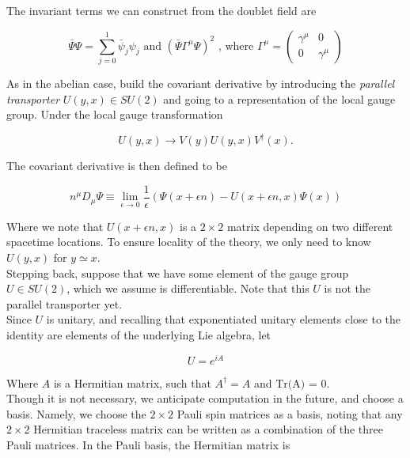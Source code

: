 \documentclass[10pt]{article}
\begin{document}
\noindent The invariant terms we can construct from the doublet field are 

\begin{equation}
\bar{\Psi} \Psi = \sum_{j=0}^1 \bar{\psi}_j \psi_j \text{ and } (\bar{\Psi} \Gamma^\mu \Psi)^2 \text{ , where } \Gamma^\mu = 
\left( \begin{array}{cc}
\gamma^\mu & 0 \\
0 & \gamma^\mu
\end{array} \right)
\end{equation}

\noindent As in the abelian case, build the covariant derivative by introducing the \textit{parallel transporter} $U(y,x) \in SU(2)$ and going to a representation of the local gauge group. Under the local gauge transformation

\begin{equation}
U(y,x) \rightarrow V(y) U(y,x) V^\dagger (x).
\end{equation}

\noindent The covariant derivative is then defined to be

\begin{equation}
n^\mu D_\mu \Psi \equiv \lim_{\epsilon \rightarrow 0} \frac{1}{\epsilon} (\Psi (x + \epsilon n) - U(x + \epsilon n, x) \Psi (x))
\end{equation}

\noindent Where we note that $U(x + \epsilon n, x)$ is a $2 \times 2$ matrix depending on two different spacetime locations. To ensure locality of the theory, we only need to know $U(y,x)$ for $y \simeq x$.\\

\noindent Stepping back, suppose that we have some element of the gauge group $U \in SU(2)$, which we assume is differentiable. Note that this $U$ is not the parallel transporter yet. \\

\noindent Since $U$ is unitary, and recalling that exponentiated unitary elements close to the identity are elements of the underlying Lie algebra, let

\begin{equation}
U = e^{i A}
\end{equation}

\noindent Where $A$ is a Hermitian matrix, such that $A^\dagger = A$ and $\text{Tr(A) = 0}$. \\

\noindent Though it is not necessary, we anticipate computation in the future, and choose a basis. Namely, we choose the $2 \times 2$ Pauli spin matrices as a basis, noting that any $2 \times 2$ Hermitian traceless matrix can be written as a combination of the three Pauli matrices. In the Pauli basis, the Hermitian matrix is
\end{document}
